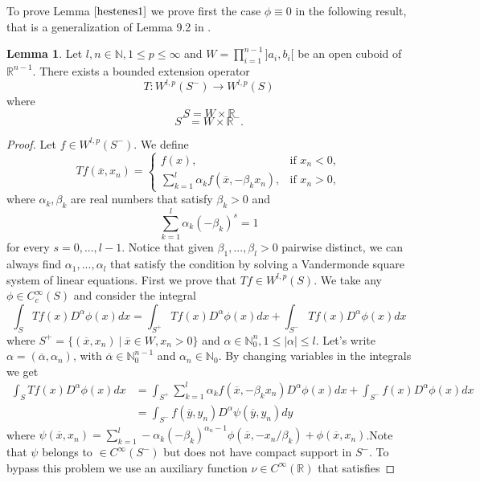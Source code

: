 \documentclass[12pt]{article}
\theoremstyle{definition}
\newtheorem{lemma}{Lemma}
\begin{document}
To prove Lemma $\ref{hestenes1}$ we prove first the case $\phi \equiv 0$ in the following result, that is a generalization of Lemma 9.2 in \cite{brezis}.

\begin{lemma}\label{hestenes2}
Let $l,n \in \mathbb{N}, 1\le p \le \infty$ and $W = \prod\limits_{i=1}^{n-1}]a_i,b_i[$ be an open cuboid of $\mathbb{R}^{n-1}$. There exists a bounded extension operator
\[ T: W^{l,p}(S^-) \rightarrow W^{l,p}(S)\]
where 
\[ S=W \times \mathbb{R} \]
\[ S^-=W \times \mathbb{R}^-.\]
\end{lemma}
\begin{proof}
Let $f \in W^{l,p}(S^-)$. We define
\[ Tf(\overline x,x_n) = \begin{cases}
		f(x), & \text {if }x_n<0, \\
		\sum_{k=1}^l \alpha_k f(\overline x,-\beta_k x_n),  &\text {if } x_n>0, 
		\end{cases}
\]
where $\alpha_k,\beta_k$ are real numbers that satisfy $\beta_k>0$ and
\begin{equation}\label{alfabeta}
 \sum_{k=1}^l \alpha_k (-\beta_k)^s=1  
\end{equation}
for every $s=0,...,l-1$.  Notice that given $\beta_1,...,\beta_l>0$  pairwise distinct, we can always find $\alpha_1,...,\alpha_l$ that satisfy the condition by solving a Vandermonde square system of linear equations. First we prove that $Tf \in W^{l,p}(S)$. We take any $\phi \in C^\infty_c(S)$ and consider the integral 
\[ \int_S Tf(x)D^\alpha\phi(x)dx= \int_{S^+} Tf(x)D^\alpha\phi(x)dx+ \int_{S^-} Tf(x)D^\alpha\phi(x)dx\]
where $S^+=\{(\overline x,x_n) \ | \  \overline x \in W, x_n>0 \}$ and $\alpha \in \mathbb{N}^n_0, 1\le|\alpha|\le l$. Let's write $\alpha=(\overline \alpha,\alpha_n)$, with $\overline \alpha \in \mathbb{N}^{n-1}_0$ and $\alpha_n \in  \mathbb{N}_0$.  By changing variables in the integrals we get 
\begin{align*}
 \int_S Tf(x)D^\alpha\phi(x)dx &= \int_{S^+}\sum_{k=1}^l \alpha_k f(\overline x,-\beta_k x_n)  D^\alpha\phi(x)dx+ \int_{S^-} f(x)D^\alpha\phi(x) dx\\
				   &= \int_{S^-} f(\overline y,y_n) D^\alpha \psi(\overline y, y_n) dy \tag{*}
\end{align*}
where $\psi(\overline x,x_n)= \sum_{k=1}^l -\alpha_k (-\beta_k)^{\alpha_n-1}\phi \left( \overline x,-x_n/\beta_k\right)+\phi(\overline x,x_n) $.Note that $\psi$ belongs to $\in C^\infty(S^-)$ but does not have compact support in $S^-$. To bypass this problem we use an auxiliary function $\nu \in C^\infty(\mathbb{R})$ that satisfies 

\end{proof}
\end{document}
